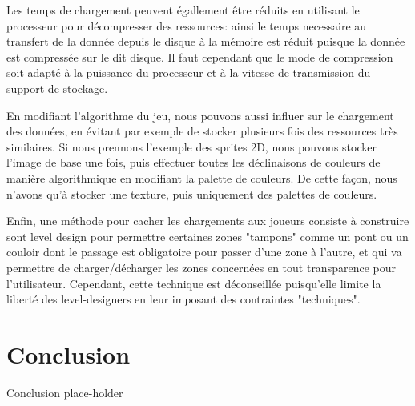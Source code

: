 \documentclass[a4paper, 11pt]{article} %
\begin{document}
Les temps de chargement peuvent égallement être réduits en utilisant le processeur pour décompresser des ressources: ainsi le temps necessaire au transfert de la donnée depuis le disque à la mémoire est réduit puisque la donnée est compressée sur le dit disque. Il faut cependant que le mode de compression soit adapté à la puissance du processeur et à la vitesse de transmission du support de stockage.

En modifiant l'algorithme du jeu, nous pouvons aussi influer sur le chargement des données, en évitant par exemple de stocker plusieurs fois des ressources très similaires. Si nous prennons l'exemple des sprites 2D, nous pouvons stocker l'image de base une fois, puis effectuer toutes les déclinaisons de couleurs de manière algorithmique en modifiant la palette de couleurs. De cette façon, nous n'avons qu'à stocker une texture, puis uniquement des palettes de couleurs.

Enfin, une méthode pour cacher les chargements aux joueurs consiste à construire sont level design pour permettre certaines zones "tampons" comme un pont ou un couloir dont le passage est obligatoire pour passer d'une zone à l'autre, et qui va permettre de charger/décharger les zones concernées en tout transparence pour l'utilisateur. Cependant, cette technique est déconseillée puisqu'elle limite la liberté des level-designers en leur imposant des contraintes "techniques".


\section*{Conclusion}
Conclusion place-holder






\end{document}
